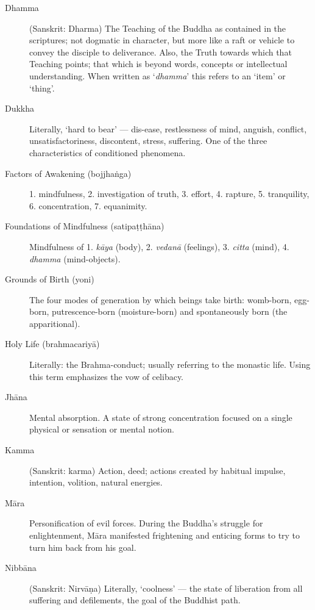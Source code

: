 \begin{description}
\item[Dhamma] (Sanskrit: Dharma) The Teaching of the Buddha as contained
  in the scriptures; not dogmatic in character, but more like a raft or
  vehicle to convey the disciple to deliverance. Also, the Truth towards
  which that Teaching points; that which is beyond words, concepts or
  intellectual understanding. When written as ‘\emph{dhamma}’ this
  refers to an ‘item’ or ‘thing’.

\item[Dukkha] Literally, ‘hard to bear’ --- dis-ease, restlessness of
  mind, anguish, conflict, unsatisfactoriness, discontent, stress,
  suffering. One of the three characteristics of conditioned phenomena.

\item[Factors of Awakening (bojjhaṅga)] 1. mindfulness, 2. investigation
of truth, 3. effort, 4. rapture, 5. tranquility, 6. concentration, 7.
equanimity.

\item[Foundations of Mindfulness (satipaṭṭhāna)] Mindfulness of 1.
\emph{kāya} (body), 2. \emph{vedanā} (feelings), 3. \emph{citta} (mind),
4. \emph{dhamma} (mind-objects).

\item[Grounds of Birth (yoni)] The four modes of generation by which
  beings take birth: womb-born, egg-born, putrescence-born
  (moisture-born) and spontaneously born (the apparitional).

\item[Holy Life (brahmacariyā)] Literally: the Brahma-conduct; usually
  referring to the monastic life. Using this term emphasizes the vow of
  celibacy.

\item[Jhāna] Mental absorption. A state of strong concentration focused
  on a single physical or sensation or mental notion.

\item[Kamma] (Sanskrit: karma) Action, deed; actions created by habitual
  impulse, intention, volition, natural energies.

\item[Māra] Personification of evil forces. During the Buddha’s struggle
  for enlightenment, Māra manifested frightening and enticing forms to
  try to turn him back from his goal.

\item[Nibbāna] (Sanskrit: Nirvāṇa) Literally, ‘coolness’ --- the state of
  liberation from all suffering and defilements, the goal of the
  Buddhist path.


\end{description}
